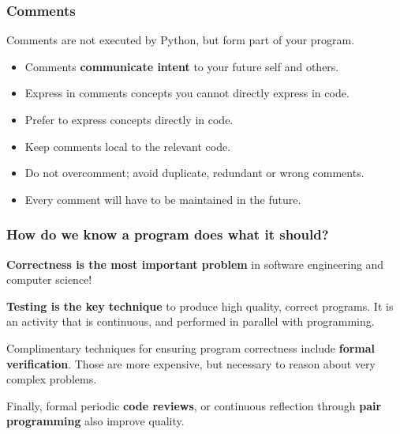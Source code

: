 \documentclass{beamer} %
\newcommand\emc[1]{\textcolor{midred}{\textbf{#1}}}
\begin{document}
\begin{frame}
\frametitle{Comments}

Comments are not executed by Python, but form part of your program.
\begin{itemize}
\item Comments \emc{communicate intent} to your future self and others.
\item Express in comments concepts you cannot directly express in code.
\item Prefer to express concepts directly in code.
\item Keep comments local to the relevant code.
\item Do not overcomment; avoid duplicate, redundant or wrong comments. 
\item Every comment will have to be maintained in the future.
\end{itemize}
\end{frame}


\begin{frame}
\frametitle{How do we know a program does what it should?}

\emc{Correctness is the most important problem} in software engineering and computer science!

\vspace{3mm}
\emc{Testing is the key technique} to produce high quality, correct programs. It is an activity that is continuous, and performed in parallel with programming.

\vspace{3mm}
Complimentary techniques for ensuring program correctness include \emc{formal verification}. Those are more expensive, but necessary to reason about very complex problems.

\vspace{3mm}
Finally, formal periodic \emc{code reviews}, or continuous reflection through \emc{pair programming} also improve quality.

\end{frame}
\end{document}

